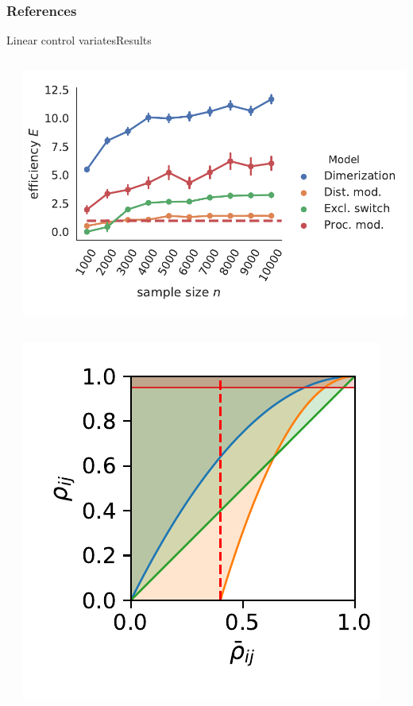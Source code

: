 \documentclass[9pt]{beamer}
\begin{document}
\begin{frame}[allowframebreaks]
    \frametitle{References}
%        
    \printbibliography
\end{frame}

\begin{frame}{Linear control variates}{Results}
    \begin{columns}
        \begin{column}{.05\paperwidth}\end{column}
        \begin{column}{.5\paperwidth}
            \includegraphics[width=\textwidth]{../gfx/sample_size.pdf}
                    \begin{columns}
                        \begin{column}{.6\textwidth}
                            \includegraphics[width=\textwidth]{../gfx/decision_funcs.pdf}

\end{column}
\end{columns}
\end{column}
\end{columns}
\end{frame}
\end{document}
